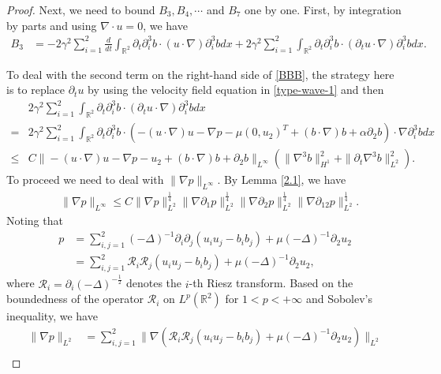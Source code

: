 \documentclass[reqno,11pt]{amsart}
\def\R{\mathbb R}
\numberwithin{Thm}{section}
\begin{document}
\begin{proof}
Next, we need to bound $B_{3},B_{4},\cdots$ and $B_{7}$ one by one. First, by integration by parts and using $\nabla\cdot u=0$, we have
\begin{align}\label{BBB}
B_{3}
&=-2\gamma^2\sum_{i=1}^2\frac{d}{dt}\int_{\R^2}\partial_{t}\partial_i^3b\cdot (u\cdot\nabla)\partial_i^3 bdx
+2\gamma^2\sum_{i=1}^2\int_{\R^2}\partial_{t}\partial_i^3b\cdot (\partial_{t}u\cdot\nabla)\partial_i^3 bdx.
\end{align}





To deal with the second term on the right-hand side of \eqref{BBB}, the strategy here is to replace $\partial_t u$ by using the velocity field equation  in \eqref{type-wave-1}
and then
\begin{align}\label{K3112}
&2\gamma^2\sum_{i=1}^2\int_{\R^2}\partial_{t}\partial_i^3b\cdot (\partial_{t}u\cdot\nabla)\partial_i^3 bdx\nonumber\\
=&2\gamma^2\sum_{i=1}^2\int_{\R^2}\partial_{t}\partial_i^3b\cdot \left(-(u\cdot\nabla) u-\nabla p-\mu (0,u_2)^{T}+(b\cdot\nabla) b+\alpha\partial_2b
\right)\cdot\nabla\partial_i^3 bdx\nonumber\\
\leq&C\|-(u\cdot\nabla)u-\nabla p-u_2+(b\cdot\nabla )b+\partial_2b\|_{L^{\infty}}\left(\|\nabla^3 b\|_{H^1}^2+\|\partial_t\nabla^3 b\|_{L^2}^2\right).
\end{align}
To proceed we need to deal with $\|\nabla p\|_{L^{\infty}}$. By Lemma \ref{2.1}, we have
\begin{align}\label{PP11}
&\|\nabla p\|_{L^{\infty}}\leq C\|\nabla p\|_{L^2}^{\frac{1}{4}}\|\nabla\partial_1 p\|_{L^2}^{\frac{1}{4}}\|\nabla \partial_2 p\|_{L^2}^{\frac{1}{4}}\|\nabla \partial_{12}p\|_{L^2}^{\frac{1}{4}}.
\end{align}
Noting that
\begin{align*}
p&=\sum_{i,j=1}^2(-\Delta)^{-1}\partial_i\partial_j(u_i u_j-b_i b_j)+\mu(-\Delta)^{-1}\partial_2u_2\nonumber\\
&= \sum_{i,j=1}^2\mathcal{R}_i\mathcal{R}_j(u_i u_j-b_i b_j)+\mu(-\Delta)^{-1}\partial_2u_2,
\end{align*}
where $\mathcal{R}_i=\partial_i(-\Delta)^{-\frac 12}$ denotes the $i$-th Riesz transform.
Based on the boundedness of the operator $\mathcal{R}_i$ on $L^p(\mathbb{R}^2)$ for $1<p<+\infty$ and Sobolev's inequality, we have
\begin{align}\label{P}
\|\nabla p\|_{L^2}&=\sum_{i,j=1}^2\|\nabla\left(\mathcal{R}_i\mathcal{R}_j(u_i u_j-b_i b_j)+\mu{(-\Delta)}^{-1}\partial_2u_2\right)\|_{L^2}\nonumber\\

\end{align}
\end{proof}
\end{document}
